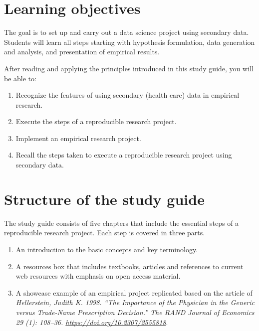 \documentclass[
]{book}
\providecommand{\tightlist}{%
  \setlength{\itemsep}{0pt}\setlength{\parskip}{0pt}}
\begin{document}
\hypertarget{learning-objectives}{%
\section*{Learning objectives}\label{learning-objectives}}

The goal is to set up and carry out a data science project using
secondary data. Students will learn all steps starting with hypothesis
formulation, data generation and analysis, and presentation of empirical
results.

After reading and applying the principles introduced in this study
guide, you will be able to:

\begin{enumerate}
\def\labelenumi{\arabic{enumi}.}
\tightlist
\item
  Recognize the features of using secondary (health care) data in
  empirical research.
\item
  Execute the steps of a reproducible research project.
\item
  Implement an empirical research project.
\item
  Recall the steps taken to execute a reproducible research project
  using secondary data.
\end{enumerate}

\hypertarget{structure-of-the-study-guide}{%
\section*{Structure of the study
guide}\label{structure-of-the-study-guide}}

The study guide consists of five chapters that include the essential
steps of a reproducible research project. Each step is covered in three
parts.

\begin{enumerate}
\def\labelenumi{\arabic{enumi}.}
\tightlist
\item
  An introduction to the basic concepts and key terminology.
\item
  A resources box that includes textbooks, articles and references to
  current web resources with emphasis on open access material.
\item
  A showcase example of an empirical project replicated based on the
  article of \emph{Hellerstein, Judith K. 1998. ``The Importance of the
  Physician in the Generic versus Trade-Name Prescription Decision.''
  The RAND Journal of Economics 29 (1): 108--36.
  \url{https://doi.org/10.2307/2555818}}.
\end{enumerate}
\end{document}
